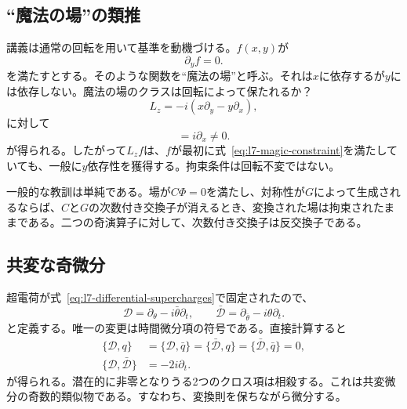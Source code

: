 \subsection{``魔法の場''の類推}

講義は通常の回転を用いて基準を動機づける。\(f(x,y)\)が
\begin{equation}
\partial_y f=0.
\label{eq:l7-magic-constraint}
\end{equation}
を満たすとする。そのような関数を``魔法の場''と呼ぶ。それは\(x\)に依存するが\(y\)には依存しない。魔法の場のクラスは回転によって保たれるか？
\begin{equation}
L_z=-i\left(x\partial_y-y\partial_x\right),
\end{equation}
に対して
\begin{equation}
[\partial_y,L_z]=i\partial_x\neq0.
\end{equation}
が得られる。したがって\(L_z f\)は、\(f\)が最初に式~\eqref{eq:l7-magic-constraint}を満たしていても、一般に\(y\)依存性を獲得する。拘束条件は回転不変ではない。

一般的な教訓は単純である。場が\(C\Phi=0\)を満たし、対称性が\(G\)によって生成されるならば、\(C\)と\(G\)の次数付き交換子が消えるとき、変換された場は拘束されたままである。二つの奇演算子に対して、次数付き交換子は反交換子である。

\begin{classroomqa}
\end{classroomqa}

\subsection{共変な奇微分}

超電荷が式~\eqref{eq:l7-differential-supercharges}で固定されたので、
\begin{equation}
\mathcal D=\partial_\theta-i\bar\theta\partial_t,
\qquad
\bar{\mathcal D}=\partial_{\bar\theta}-i\theta\partial_t.
\label{eq:l7-covariant-derivatives}
\end{equation}
と定義する。唯一の変更は時間微分項の符号である。直接計算すると
\begin{align}
\{\mathcal D,q\}
&=\{\mathcal D,\bar q\}
=\{\bar{\mathcal D},q\}
=\{\bar{\mathcal D},\bar q\}=0,\\
\{\mathcal D,\bar{\mathcal D}\}&=-2i\partial_t.
\label{eq:l7-covariant-algebra}
\end{align}
が得られる。潜在的に非零となりうる2つのクロス項は相殺する。これは共変微分の奇数的類似物である。すなわち、変換則を保ちながら微分する。

